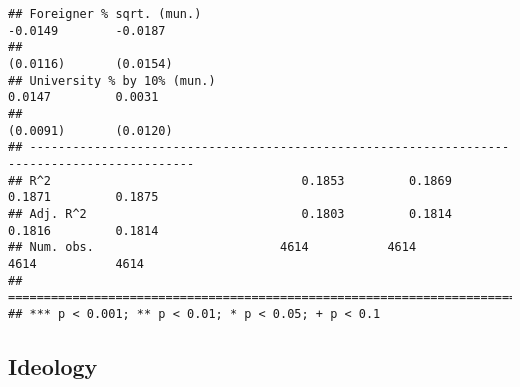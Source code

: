\documentclass[
]{article}
\begin{document}
\begin{verbatim}
## Foreigner % sqrt. (mun.)                                           -0.0149        -0.0187    
##                                                                    (0.0116)       (0.0154)   
## University % by 10% (mun.)                                          0.0147         0.0031    
##                                                                    (0.0091)       (0.0120)   
## ---------------------------------------------------------------------------------------------
## R^2                                   0.1853         0.1869         0.1871         0.1875    
## Adj. R^2                              0.1803         0.1814         0.1816         0.1814    
## Num. obs.                          4614           4614           4614           4614         
## =============================================================================================
## *** p < 0.001; ** p < 0.01; * p < 0.05; + p < 0.1
\end{verbatim}

\hypertarget{ideology-1}{%
\subsection{Ideology}\label{ideology-1}}
\end{document}
